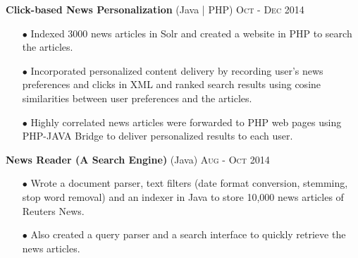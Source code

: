 \documentclass[letterpaper,11pt]{article}
\begin{document}
\textbf{\normalsize{Click-based News Personalization}} (Java | PHP)
\hfill{\textsc{Oct - Dec 2014}}


{ 
\begin{itemize}\setlength{\itemsep}{-1pt}
        \item [$\bullet$] Indexed 3000 news articles in Solr and created a website in PHP to search the articles. 
        \item [$\bullet$] Incorporated personalized content delivery by recording user's news preferences and clicks in XML and ranked search results using cosine similarities between user preferences and the articles.
          \item [$\bullet$] Highly correlated news articles were forwarded to PHP web pages using PHP-JAVA Bridge to deliver personalized results to each user.
\end{itemize}          
}


\textbf{\normalsize{News Reader (A Search Engine)}} (Java)
\hfill{\textsc{Aug - Oct 2014}}

{
\begin{itemize}\setlength{\itemsep}{-1pt}
        \item [$\bullet$] Wrote a document parser, text filters (date format conversion, stemming, stop word removal) and an indexer in Java to store 10,000 news articles of Reuters News. 
        \item [$\bullet$] Also created a query parser and a search interface to quickly retrieve the news articles.\\[-3mm]
\end{itemize}
        }







\end{document}
